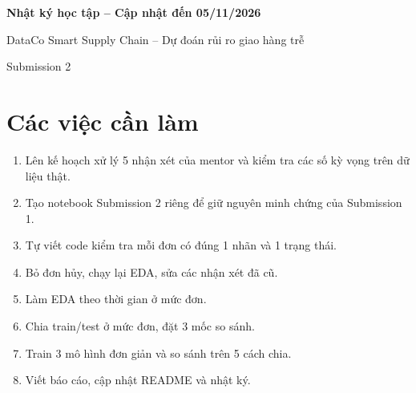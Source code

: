 \documentclass[11pt,a4paper]{article}
\begin{document}
\begin{center}
{\LARGE\bfseries Nhật ký học tập -- Cập nhật đến 05/11/2026\par}
\vspace{0.2cm}
{\large DataCo Smart Supply Chain -- Dự đoán rủi ro giao hàng trễ\par}
\vspace{0.2cm}
{\small Submission 2\par}
\end{center}
\vspace{0.3cm}

\section{Các việc cần làm}
\begin{enumerate}
  \item Lên kế hoạch xử lý 5 nhận xét của mentor và kiểm tra các số kỳ vọng trên dữ liệu thật.
  \item Tạo notebook Submission 2 riêng để giữ nguyên minh chứng của Submission 1.
  \item Tự viết code kiểm tra mỗi đơn có đúng 1 nhãn và 1 trạng thái.
  \item Bỏ đơn hủy, chạy lại EDA, sửa các nhận xét đã cũ.
  \item Làm EDA theo thời gian ở mức đơn.
  \item Chia train/test ở mức đơn, đặt 3 mốc so sánh.
  \item Train 3 mô hình đơn giản và so sánh trên 5 cách chia.
  \item Viết báo cáo, cập nhật README và nhật ký.
\end{enumerate}

\end{document}
